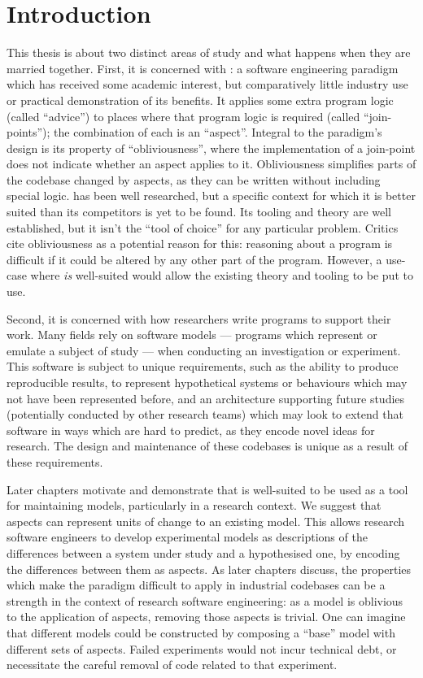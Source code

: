 \chapter{Introduction}

 This
thesis is about two distinct areas of study and what happens when they are
married together. First, it is concerned with \aop{}: a software engineering
paradigm which has received some academic interest, but comparatively little
industry use or practical demonstration of its benefits. It applies some extra
program logic (called ``advice'') to places where that program logic is required
(called ``join-points''); the combination of each is an ``aspect''. Integral to
the paradigm's design is its property of ``obliviousness'', where the
implementation of a join-point does not indicate whether an aspect applies to
it. Obliviousness simplifies parts of the codebase changed by aspects, as they
can be written without including special \aop{} logic. \Aspectorientation has
been well researched, but a specific context for which it is better suited than
its competitors is yet to be found. Its tooling and theory are well established,
but it isn't the ``tool of choice'' for any particular problem. Critics cite
obliviousness as a potential reason for this: reasoning about a program is
difficult if it could be altered by any other part of the program. However, a
use-case where \aop{} \emph{is} well-suited would allow the existing theory and
tooling to be put to use.

Second, it is concerned with how researchers write programs to support their
work. Many fields rely on software models --- programs which represent or
emulate a subject of study --- when conducting an investigation or experiment.
This software is subject to unique requirements, such as the ability to produce
reproducible results, to represent hypothetical systems or behaviours which may
not have been represented before, and an architecture supporting future studies
(potentially conducted by other research teams) which may look to extend that
software in ways which are hard to predict, as they encode novel ideas for
research. The design and maintenance of these codebases is unique as a result of
these requirements.

Later chapters motivate and demonstrate that \aop{} is well-suited to be used as
a tool for maintaining models, particularly in a research context. We suggest
that aspects can represent units of change to an existing model. This allows
research software engineers to develop experimental models as descriptions of
the differences between a system under study and a hypothesised one, by encoding
the differences between them as aspects. As later chapters discuss, the
properties which make the paradigm difficult to apply in industrial codebases
can be a strength in the context of research software engineering: as a model is
oblivious to the application of aspects, removing those aspects is trivial. One
can imagine that different models could be constructed by composing a ``base''
model with different sets of aspects. Failed experiments would not incur
technical debt, or necessitate the careful removal of code related to that
experiment.

